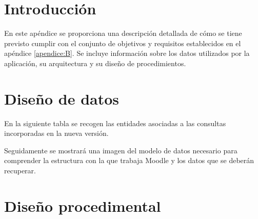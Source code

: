 
\section{Introducción}
En este apéndice se proporciona una descripción detallada de cómo se tiene previsto cumplir con el conjunto de objetivos y requisitos establecidos en el apéndice \ref{apendice:B}. Se incluye información sobre los datos utilizados por la aplicación, su arquitectura y su diseño de procedimientos.
\section{Diseño de datos}
En la siguiente tabla se recogen las entidades asociadas a las consultas incorporadas en la nueva versión.
\begin{table}[H]
\end{table}
Seguidamente se mostrará una imagen del modelo de datos necesario para comprender la estructura con la que trabaja Moodle y los datos que se deberán recuperar.
\section{Diseño procedimental}
